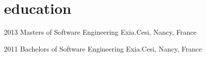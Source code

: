 \documentclass[]{friggeri-cv} %
\begin{document}






\section{education}

\begin{entrylist}


\entry
{2013}
{Masters {\normalfont of Software Engineering}}
{}
{Exia.Cesi, Nancy, France}
{}


\entry
{2011}
{Bachelors {\normalfont of Software Engineering}}
{}
{Exia.Cesi, Nancy, France}
{}


\end{entrylist}
\end{document}
